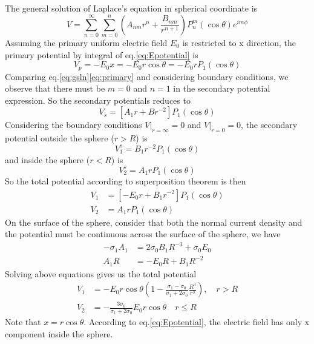\documentclass[11pt,letterpaper,leqno]{amsart}
\numberwithin{equation}{section}
\begin{document}
The general solution of Laplace's equation in spherical coordinate is
\begin{equation}\label{eq:gsln}
V = \sum\limits_{n=0}^\infty\sum\limits_{m=0}^n (A_{nm}r^n + \frac{B_{nm}}{r^{n+1}})P_n^m(\cos\theta)e^{im\phi}
\end{equation}  
Assuming the primary uniform electric field $E_0$ is restricted to x direction, the primary potential by integral of eq.\eqref{eq:Epotential} is
\begin{equation}\label{eq:primary}
V_p = -E_0 x = -E_0 r\cos\theta = -E_0 r P_1(\cos\theta)
\end{equation}
Comparing eq.\eqref{eq:gsln}\eqref{eq:primary} and considering boundary conditions, we observe that there must be $m=0$ and $n=1$ in the secondary potential expression. So the secondary potentials reduces to
\begin{equation}
V_s = [A_1r+Br^{-2}]P_1(\cos\theta)
\end{equation}
Considering the boundary conditions $V|_{r=\infty}=0$ and $V|_{r=0}=0$, the secondary potential outside the sphere ($r>R$) is
\begin{equation}
V_1^s = B_1r^{-2}P_1(\cos\theta)
\end{equation}
and inside the sphere ($r<R$) is
\begin{equation}
V_2^s = A_1rP_1(\cos\theta)
\end{equation}
So the total potential according to superposition theorem is then
\begin{align}
V_1 &= [-E_0r + B_1r^{-2}]P_1(\cos\theta) \\
V_2 &= A_1rP_1(\cos\theta)
\end{align}
On the surface of the sphere, consider that both the normal current density and the potential must be continuous across the surface of the sphere, we have
\begin{align}
-\sigma_1A_1 &= 2\sigma_0B_1R^{-3} + \sigma_0E_0 \\
A_1R &= -E_0R + B_1R^{-2}
\end{align}
Solving above equations gives us the total potential
\begin{align}
V_1 &= -E_0r\cos\theta(1 - \frac{\sigma_1-\sigma_0}{\sigma_1+2\sigma_0}\frac{R^3}{r^3}), \quad r > R \\
V_2 &= -\frac{3\sigma_0}{\sigma_1+2\sigma_0}E_0r\cos\theta \quad r\leq R
\end{align}
Note that $x = r\cos\theta$. According to eq.\eqref{eq:Epotential}, the electric field has only x component inside the sphere.
\end{document}
